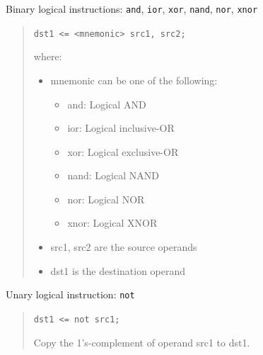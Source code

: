 \documentclass[a4paper]{article}
\begin{document}
Binary logical instructions: \texttt{and}, \texttt{ior}, \texttt{xor}, \texttt{nand}, \texttt{nor}, \texttt{xnor}
%
\begin{quote}

\texttt{dst1 <= <mnemonic> src1, src2;}

where:
%
\begin{itemize}

\item mnemonic can be one of the following:
%
\begin{itemize}

\item and: Logical AND

\item ior: Logical inclusive-OR

\item xor: Logical exclusive-OR

\item nand: Logical NAND

\item nor: Logical NOR

\item xnor: Logical XNOR

\end{itemize}

\item src1, src2 are the source operands

\item dst1 is the destination operand

\end{itemize}

\end{quote}

Unary logical instruction: \texttt{not}
%
\begin{quote}

\texttt{dst1 <= not src1;}

Copy the 1's-complement of operand src1 to dst1.

\end{quote}
\end{document}
